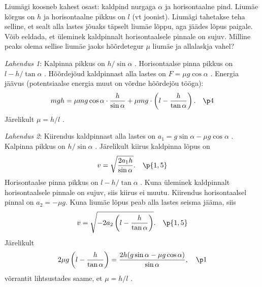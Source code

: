 
Liumägi koosneb kahest osast: kaldpind nurgaga $\alpha$ ja horisontaalne pind. Liumäe kõrgus on $h$ ja horisontaalne pikkus on $l$ (vt joonist). Liumägi tahetakse teha selline, et sealt alla lastes jõuaks täpselt liumäe lõppu, aga jäädes lõpus paigale. Võib eeldada, et üleminek kaldpinnalt horisontaalsele pinnale on sujuv. Milline peaks olema sellise liumäe jaoks hõõrdetegur $\mu$ liumäe ja allalaskja vahel?
\begin{figure}[h]
  \vspace{-1.5em}
  \centering
  {
  }
  \vspace{-2em}
\end{figure}


\hint

\solu
\emph{Lahendus 1}:
Kalpinna pikkus on $h/\sin \alpha$ . Horisontaalse pinna pikkus on $l-h/\tan \alpha$ .
Hõõrdejõud kaldpinnast alla lastes on $F=\mu g \cos \alpha$ . Energia jäävus (potentsiaalse energia muut on võrdne hõõrdejõu tööga):
\begin{equation*}
mgh = \mu mg \cos \alpha \cdot \frac{h}{\sin \alpha} + \mu mg \cdot \left(l- \frac{h}{\tan \alpha}\right). \quad \p4
\end{equation*}
Järelikult $\mu=h/l$ .

\emph{Lahendus 2}:
Kiirendus kaldpinnast alla lastes on $a_1=g \sin \alpha - \mu g \cos \alpha$ . Kalpinna pikkus on $h/\sin \alpha$ . Järelikult kiirus kaldpinna lõpus on
\begin{equation*}
  v=\sqrt{\frac{2a_1h}{\sin \alpha}}. \quad \p{1,5}
\end{equation*}
Horisontaalse pinna pikkus on $l-h/\tan \alpha$ . Kuna üleminek kaldpinnalt horisontaalsele pinnale on sujuv, siis kiirus ei muutu. Kiirendus horisontaalsel pinnal on $a_2= - \mu g $. Kuna liumäe lõpus peab alla lastes seisma jääma, siis
\begin{equation*}
  v=\sqrt{-2a_2\left(l-\frac{h}{\tan \alpha}\right)}.\quad \p{1,5}
\end{equation*}
Järelikult
\begin{equation*}
  2\mu g\left(l-\frac{h}{\tan \alpha}\right)=\frac{2h(g\sin \alpha - \mu g \cos \alpha)}{\sin \alpha}, \quad \p1
\end{equation*}
võrrantit lihtsustades saame, et $\mu=h/l$ .
\probend